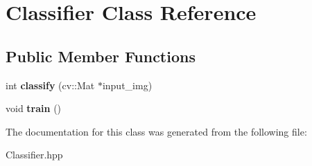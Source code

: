 \hypertarget{class_classifier}{\section{Classifier Class Reference}
\label{class_classifier}
}
\subsection*{Public Member Functions}
\begin{DoxyCompactItemize}
\item 
\hypertarget{class_classifier_afd14ddf13364da1a9bd5b1e45eab9b3f}{int {\bfseries classify} (cv\+::\+Mat $\ast$input\+\_\+img)}\label{class_classifier_afd14ddf13364da1a9bd5b1e45eab9b3f}

\item 
\hypertarget{class_classifier_a472a413b30e86e522e2a7894416956cd}{void {\bfseries train} ()}\label{class_classifier_a472a413b30e86e522e2a7894416956cd}

\end{DoxyCompactItemize}


The documentation for this class was generated from the following file\+:\begin{DoxyCompactItemize}
\item 
Classifier.\+hpp\end{DoxyCompactItemize}
